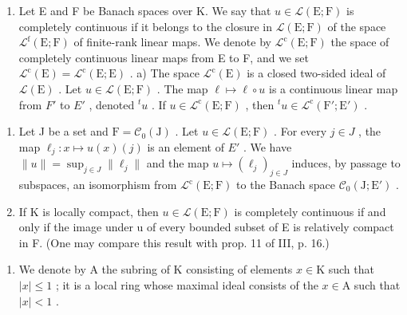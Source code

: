 \begin{enumerate}
\def\labelenumi{\arabic{enumi})}
\setcounter{enumi}{1}
\tightlist
\item
  Let E and F be Banach spaces over K. We say that \(u \in \mathcal{L}(\mathrm{E};\mathrm{F})\) is completely continuous if it belongs to the closure in \(\mathcal{L}(\mathrm{E};\mathrm{F})\) of the space \(\mathcal{L}^{\mathrm{f}}(\mathrm{E};\mathrm{F})\) of finite-rank linear maps. We denote by \(\mathcal{L}^{\mathrm{c}}(\mathrm{E};\mathrm{F})\) the space of completely continuous linear maps from E to F, and we set \(\mathcal{L}^{\mathrm{c}}(\mathrm{E}) = \mathcal{L}^{\mathrm{c}}(\mathrm{E};\mathrm{E})\) . a) The space \(\mathcal{L}^{\mathrm{c}}(\mathrm{E})\) is a closed two-sided ideal of \(\mathcal{L}(\mathrm{E})\) . Let \(u \in \mathcal{L}(\mathrm{E};\mathrm{F})\) . The map \(\ell \mapsto \ell \circ u\) is a continuous linear map from \(F'\) to \(E'\) , denoted \({}^{t}u\) . If \(u \in \mathcal{L}^{\mathrm{c}}(\mathrm{E};\mathrm{F})\) , then \({}^{t}u \in \mathcal{L}^{\mathrm{c}}(\mathrm{F}'; \mathrm{E}')\) .
\end{enumerate}

\begin{enumerate}
\def\labelenumi{\alph{enumi})}
\setcounter{enumi}{1}
\item
  Let J be a set and \(\mathrm{F} = \mathcal{C}_{0}(\mathrm{J})\) . Let \(u \in \mathcal{L}(\mathrm{E};\mathrm{F})\) . For every \(j \in J\) , the map \(\ell_{j} \colon x \mapsto u(x)(j)\) is an element of \(E'\) . We have \(\|u\| = \sup_{j \in J} \| \ell_{j} \|\) and the map \(u \mapsto (\ell_{j})_{j \in J}\) induces, by passage to subspaces, an isomorphism from \(\mathcal{L}^{\mathrm{c}}(\mathrm{E};\mathrm{F})\) to the Banach space \(\mathcal{C}_{0}(\mathrm{J};\mathrm{E}')\) .
\item
  If K is locally compact, then \(u \in \mathcal{L}(\mathrm{E}; \mathrm{F})\) is completely continuous if and only if the image under u of every bounded subset of E is relatively compact in F. (One may compare this result with prop. 11 of III, p. 16.)
\end{enumerate}

\begin{enumerate}
\def\labelenumi{\arabic{enumi})}
\setcounter{enumi}{2}
\tightlist
\item
  We denote by A the subring of K consisting of elements \(x \in \mathrm{K}\) such that \(|x| \leqslant 1\) ; it is a local ring whose maximal ideal consists of the \(x \in \mathrm{A}\) such that \(|x| < 1\) .
\end{enumerate}

